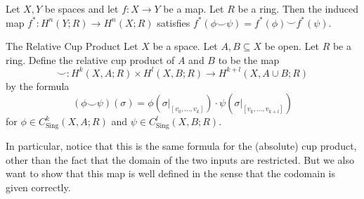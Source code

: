 \documentclass[a4paper]{article}
\begin{document}
\begin{lmm}{}{} Let $X,Y$ be spaces and let $f:X\to Y$ be a map. Let $R$ be a ring. Then the induced map $f^\ast:H^n(Y;R)\to H^n(X;R)$ satisfies $f^\ast(\phi\smile\psi)=f^\ast(\phi)\smile f^\ast(\psi)$. 
\end{lmm}

\begin{defn}{The Relative Cup Product}{} Let $X$ be a space. Let $A,B\subseteq X$ be open. Let $R$ be a ring. Define the relative cup product of $A$ and $B$ to be the map $$\smile:H^k(X,A;R)\times H^l(X,B;R)\to H^{k+l}(X,A\cup B;R)$$ by the formula $$(\phi\smile\psi)(\sigma)=\phi(\sigma|_{[v_0,\dots,v_k]})\cdot\psi(\sigma|_{[v_k,\dots,v_{k+l}]})$$ for $\phi\in C_\text{Sing}^k(X,A;R)$ and $\psi\in C_\text{Sing}^l(X,B;R)$. 
\end{defn}

In particular, notice that this is the same formula for the (absolute) cup product, other than the fact that the domain of the two inputs are restricted. But we also want to show that this map is well defined in the sense that the codomain is given correctly. 
\end{document}
